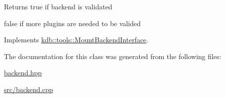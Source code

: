 \begin{DoxyReturn}{Returns}
true if backend is validated 

false if more plugins are needed to be valided 
\end{DoxyReturn}


Implements \hyperlink{classkdb_1_1tools_1_1MountBackendInterface}{kdb\+::tools\+::\+Mount\+Backend\+Interface}.



The documentation for this class was generated from the following files\+:\begin{DoxyCompactItemize}
\item 
\hyperlink{backend_8hpp}{backend.\+hpp}\item 
\hyperlink{src_2backend_8cpp}{src/backend.\+cpp}\end{DoxyCompactItemize}

